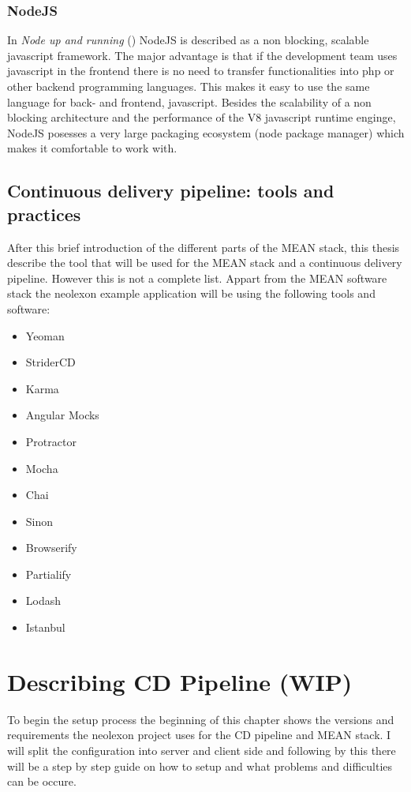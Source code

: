 \subsubsection{NodeJS}
In \textit{Node up and running} (\cite{hughes2012node}) NodeJS is described as a non blocking, scalable javascript framework. The major advantage is that
if the development team uses javascript in the frontend there is no need to transfer functionalities into php or other backend programming languages.
This makes it easy to use the same language for back- and frontend, javascript. Besides the scalability of a non blocking architecture and the performance
of the V8 javascript runtime enginge, NodeJS posesses a very large packaging ecosystem (node package manager) which makes it comfortable to work with.

\newpage

\subsection{Continuous delivery pipeline: tools and practices}
After this brief introduction of the different parts of the MEAN stack, this thesis describe the tool that will be used for the MEAN stack and a
continuous delivery pipeline. However this is not a complete list. Appart from the MEAN software stack the neolexon
example application will be using the following tools and software:

\begin{itemize}
  \item Yeoman
  \item StriderCD
  \item Karma
  \item Angular Mocks
  \item Protractor
  \item Mocha
  \item Chai
  \item Sinon
  \item Browserify
  \item Partialify
  \item Lodash
  \item Istanbul
\end{itemize}

\section{Describing CD Pipeline (WIP)}
\label{section:Describing CD Pipeline (WIP)}
To begin the setup process the beginning of this chapter shows the versions and requirements the neolexon project uses for the CD pipeline and MEAN stack.
I will split the configuration into server and client side and following by this there will be a step by step guide on how to setup and what problems and
difficulties can be occure.

